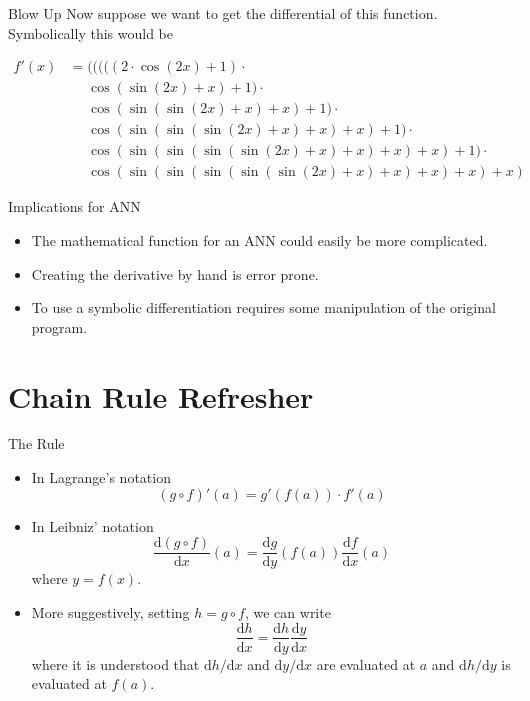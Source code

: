 \documentclass{beamer}
\begin{document}
\begin{frame}[fragile]{Blow Up}
Now suppose we want to get the differential of this
function. Symbolically this would be

$$
\begin{aligned}
f'(x) &=           (((((2\cdot \cos(2x)+1)\cdot \\
      &\phantom{=} \cos(\sin(2x)+x)+1)\cdot \\
      &\phantom{=} \cos(\sin(\sin(2x)+x)+x)+1)\cdot \\
      &\phantom{=} \cos(\sin(\sin(\sin(2x)+x)+x)+x)+1)\cdot \\
      &\phantom{=} \cos(\sin(\sin(\sin(\sin(2x)+x)+x)+x)+x)+1)\cdot \\
      &\phantom{=} \cos(\sin(\sin(\sin(\sin(\sin(2x)+x)+x)+x)+x)+x)
\end{aligned}
$$
\end{frame}

\begin{frame}[fragile]{Implications for ANN}
\begin{itemize}
\item
The mathematical function for an ANN could easily be more
complicated.
\item
Creating the derivative by hand is error prone.
\item
To use a symbolic differentiation requires some manipulation of the
original program.
\end{itemize}
\end{frame}

\section{Chain Rule Refresher}

\begin{frame}[fragile]{The Rule}
\begin{itemize}
\item
In Lagrange's notation
$$
(g \circ f)'(a) = g'(f(a))\cdot f'(a)
$$
\item
In Leibniz' notation
$$
\frac{\mathrm{d} (g \circ f)}{\mathrm{d} x}(a) =
\frac{\mathrm{d} g}{\mathrm{d} y}(f(a)) \frac{\mathrm{d} f}{\mathrm{d} x}(a)
$$
where $y = f(x)$.
\item
More suggestively, setting $h = g \circ f$, we can write
$$
\frac{\mathrm{d} h}{\mathrm{d} x} =
\frac{\mathrm{d} h}{\mathrm{d} y} \frac{\mathrm{d} y}{\mathrm{d} x}
$$
where it is understood that $\mathrm{d} h / \mathrm{d} x$ and
$\mathrm{d} y / \mathrm{d} x$ are evaluated at $a$ and $\mathrm{d} h /
\mathrm{d} y$ is evaluated at $f(a)$.
\end{itemize}
\end{frame}
\end{document}

